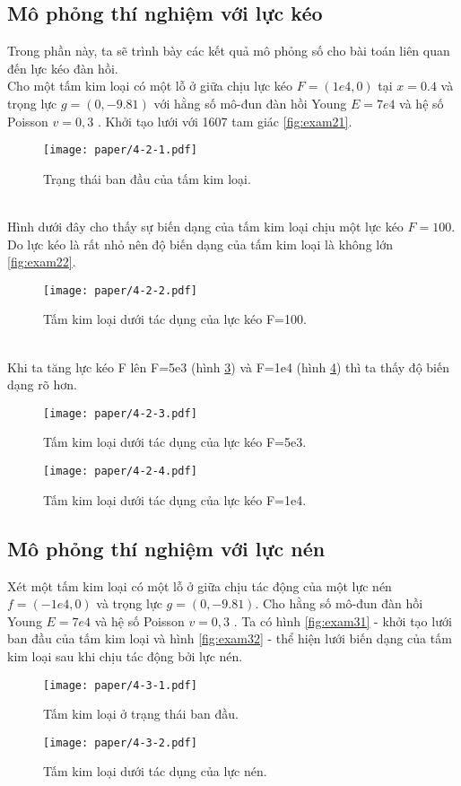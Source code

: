 \documentclass[
12pt, %
oneside, %
english, %
onehalfspacing, %
nolistspacing, %
headsepline, %
addchap,
]{MastersDoctoralThesis} %
\begin{document}
\subsection{Mô phỏng thí nghiệm với lực kéo}
Trong phần này, ta sẽ trình bày các kết quả mô phỏng số cho bài toán liên quan đến lực kéo đàn hồi.\\
Cho một tấm kim loại có một lỗ ở giữa chịu lực kéo $F=(1e4,0)$ tại $x=0.4$ và trọng lực $g=(0,-9.81)$ với hằng số mô-đun đàn hồi Young $E=7e4$ và hệ số Poisson $v=0,3$ \cite{TIT-07}. Khởi tạo lưới với 1607 tam giác \eqref{fig:exam21}.\\
\begin{figure}[http]
\centering
\texttt{[image: paper/4-2-1.pdf]}
\caption{Trạng thái ban đầu của tấm kim loại.}
\label{fig:exam21}
\end{figure}\\
Hình dưới đây cho thấy sự biến dạng của tấm kim loại chịu một lực kéo $F = 100$. Do lực kéo là rất nhỏ nên độ biến dạng của tấm kim loại là không lớn \eqref{fig:exam22}.\\
\begin{figure}[http]
\centering
\texttt{[image: paper/4-2-2.pdf]}
\caption{Tấm kim loại dưới tác dụng của lực kéo F=100.}
\label{fig:exam22}
\end{figure}\\
Khi ta tăng lực kéo F lên F=5e3 (hình \ref{fig:exam23}) và F=1e4 (hình \ref{fig:exam24}) thì ta thấy độ biến dạng rõ hơn.\\
\begin{figure}[http]
\centering
\texttt{[image: paper/4-2-3.pdf]}
\caption{Tấm kim loại dưới tác dụng của lực kéo F=5e3.}
\label{fig:exam23}
\end{figure}
\begin{figure}[http]
\centering
\texttt{[image: paper/4-2-4.pdf]}
\caption{Tấm kim loại dưới tác dụng của lực kéo F=1e4.}
\label{fig:exam24}
\end{figure}
\subsection{Mô phỏng thí nghiệm với lực nén}
Xét một tấm kim loại có một lỗ ở giữa chịu tác động của một lực nén $f=(-1e4,0)$ và trọng lực $g=(0,-9.81)$. Cho hằng số mô-đun đàn hồi Young $E=7e4$ và hệ số Poisson $v=0,3$ \cite{TIT-07}. Ta có hình \eqref{fig:exam31} - khởi tạo lưới ban đầu của tấm kim loại và hình \eqref{fig:exam32} - thể hiện lưới biến dạng của tấm kim loại sau khi chịu tác động bởi lực nén.\\
\begin{figure}[http]
\centering
\texttt{[image: paper/4-3-1.pdf]}
\caption{Tấm kim loại ở trạng thái ban đầu.}
\label{fig:exam31}
\end{figure}
\begin{figure}[http]
\centering
\texttt{[image: paper/4-3-2.pdf]}
\caption{Tấm kim loại dưới tác dụng của lực nén.}
\label{fig:exam32}
\end{figure}\\
\end{document}
